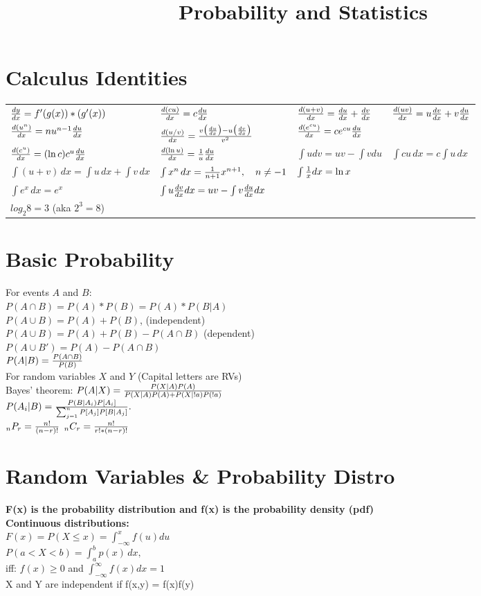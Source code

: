 \documentclass[a4paper,9pt]{extarticle}
\title{Probability and Statistics}
\def\dudx{{du \over dx}}
\begin{document}
\begin{multicols*}{2}
\section{Calculus Identities}
\begin{tabular}{ll}
${dy \over dx} =  f'(g(x))*(g'(x))$ &
${d(cu) \over dx} = c \dudx$ & ${d(u+v) \over dx} = \dudx + {dv \over dx}$ & ${d(uv) \over dx} = u {dv \over dx} + v \dudx$\\
${d(u^n) \over dx} = nu^{n-1}\dudx$ & $ {d(u/v) \over dx} = {v\big(\dudx\big) - u\big({dv \over dx}\big) \over v^2}$ & ${d(e^{cu}) \over dx} = ce^{cu}\dudx$ \\
${d(c^u) \over dx} = (\ln c) c^u\dudx$ & ${d(\ln u) \over dx} = {1 \over u} \dudx$ 
& $\int u dv = uv-\int v du$
& $\int c u \, dx = c \int u \, dx$\\
$\int (u + v) \, dx = \int u \, dx + \int v \, dx$ & $ \int x^n \, dx = {1 \over n+1}x^{n+1}, \quad n \neq -1$ & $ \int {1 \over x} dx = \ln x$\\
$\int e^x \, dx = e^x$ & $\int u {dv \over dx} dx = uv - \int v {du \over dx} dx$\\
$log_2 8 = 3$ (aka $2^3=8$)\\
\end{tabular}


\section{Basic Probability}
For events $A$ and $B$: \\
$P(A \cap B) = P(A) * P(B) = P(A)*P(B|A)$ \\
$P(A \cup B) = P(A) + P(B)$, (independent) \\
$P(A \cup B) = P(A) + P(B) - P(A \cap B)$ (dependent) \\
$P(A \cup B') = P(A) - P(A \cap B)$ \\
$P(A \vert B) = {P(A \cap B)  \over P(B)}$ \\
For random variables $X$ and $Y$ (Capital letters are RVs) \\
Bayes' theorem: 
$P(A | X) = {{P(X | A)P(A)} \over {P(X | A)P(A)+P(X | !a)P(!a)}} $ \\
$P(A_i | B) = {P(B | A_i) P[A_i] \over \sum_{j=1}^n P[A_j] P[B | A_j]}.$ \\ 
$_n P _r = {{n!} \over {(n-r)!}}$    $_n C _r = {{n!} \over {r! * (n-r)!}}$ \\
\section{Random Variables \& Probability Distro}
 \textbf{F(x) is the probability distribution and 
f(x) is the probability density (pdf)} \\
\textbf{Continuous distributions:}\\
$ F(x) = P(X \leq x) = \int_{-\infty}^x f(u)du $ \\
$P(a<X<b) = \int_{a}^b p(x) \, dx,$ \\
iff: $ f(x) \geq 0$ and $\int_{-\infty}^{\infty} \!\!\! f(x)dx=1$ \\
X and Y are independent if f(x,y) = f(x)f(y) \\


\end{multicols*}
\end{document}
